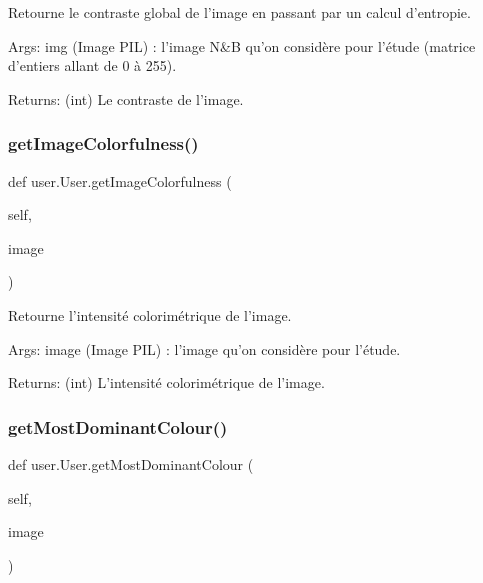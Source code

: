 \begin{DoxyVerb}Retourne le contraste global de l'image en passant par un calcul d'entropie.

Args:
    img (Image PIL) : l'image N&B qu'on considère pour l'étude (matrice d'entiers allant de 0 à 255).

Returns:
    (int) Le contraste de l'image.
\end{DoxyVerb}
 \mbox{\label{classuser_1_1_user_a1876aea4aa2e915ff8e933910f2df6e4}} 
\subsubsection{\texorpdfstring{get\+Image\+Colorfulness()}{getImageColorfulness()}}
{\footnotesize\ttfamily def user.\+User.\+get\+Image\+Colorfulness (\begin{DoxyParamCaption}\item[{}]{self,  }\item[{}]{image }\end{DoxyParamCaption})}

\begin{DoxyVerb}Retourne l'intensité colorimétrique de l'image.

Args:
        image (Image PIL) : l'image qu'on considère pour l'étude.

Returns:
        (int) L'intensité colorimétrique de l'image.
\end{DoxyVerb}
 \mbox{\label{classuser_1_1_user_a8fb05076e464cc8df275207908fd30bc}} 
\subsubsection{\texorpdfstring{get\+Most\+Dominant\+Colour()}{getMostDominantColour()}}
{\footnotesize\ttfamily def user.\+User.\+get\+Most\+Dominant\+Colour (\begin{DoxyParamCaption}\item[{}]{self,  }\item[{}]{image }\end{DoxyParamCaption})}

